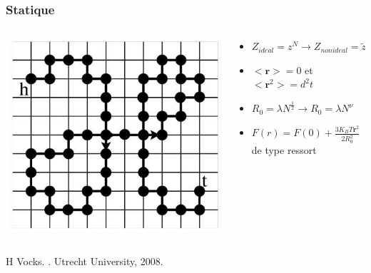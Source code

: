 \documentclass{beamer}
\begin{document}
 
\frame %
{
  \frametitle{Statique}
 \begin{columns}
 \begin{column}{0.4\textwidth}

\includegraphics[width=\textwidth]{resideal.jpg}
\end{column}
\begin{column}{0.6\textwidth}



\begin{itemize}

\item<2->$Z_{ideal}=z^N \rightarrow Z_{non ideal} = \tilde{z}^N N^{\gamma-1}$ 
\medskip


 \item<3->$<\textbf{r}>=0$ et $<\textbf{r}^2>=d^2 t$
 \medskip

 
 \item<4->$R_0=\lambda N^{\frac{1}{2}} \rightarrow R_0=\lambda N^{\nu}$
 \medskip
 
 \item<5->$F(r) = F(0) + \frac{3 K_B T \textbf{r}^2}{2 R_0^2}$ de type ressort
\end{itemize}




 
\end{column}

\end{columns}


\vfill
{\tiny

\usebibitemtemplate{\color{structure}\insertbiblabel} 
\usebibliographyblocktemplate{\color{structure}}{\color{black}}{\color{structure!75}}{\color{structure!75}} 


\begin{thebibliography}{} 

H Vocks. 
. 
\newblock  Utrecht University, 2008. 

\end{thebibliography} }
}
\end{document}
